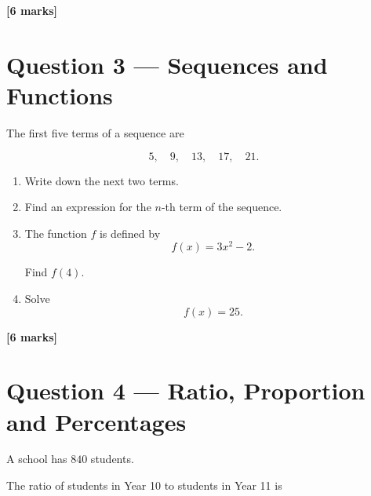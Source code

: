 	\vfill
	
	\noindent
	\textbf{[6 marks]}
	
	\newpage
	
	
	\section*{Question 3 --- Sequences and Functions}
	
	The first five terms of a sequence are
	
	\[
	5,\quad 9,\quad 13,\quad 17,\quad 21.
	\]
	
	\begin{enumerate}
		\item[(a)] Write down the next two terms.
		
		\vspace{12mm}
		
		\item[(b)] Find an expression for the \(n\)-th term of the sequence.
		
		\vspace{15mm}
		
		\item[(c)] The function \(f\) is defined by
		\[
		f(x)=3x^2-2.
		\]
		
		Find \(f(4)\).
		
		\vspace{15mm}
		
		\item[(d)] Solve
		\[
		f(x)=25.
		\]
	\end{enumerate}
	
	\vfill
	
	\noindent
	\textbf{[6 marks]}
	
	\newpage
	
	
	\section*{Question 4 --- Ratio, Proportion and Percentages}
	
	A school has \(840\) students.
	
	The ratio of students in Year 10 to students in Year 11 is
	
